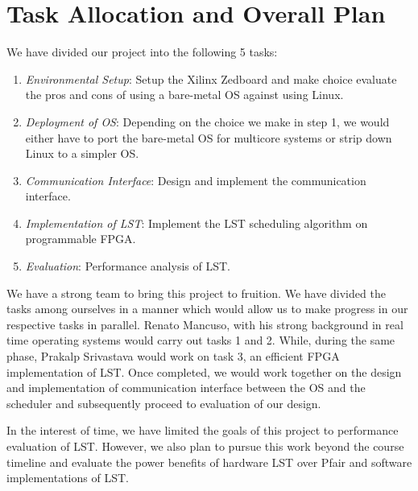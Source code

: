 \section{Task Allocation and Overall Plan}
We have divided our project into the following 5 tasks:
\begin{enumerate}
\item \textit{Environmental Setup}: Setup the Xilinx Zedboard and make choice
evaluate the pros and cons of using a bare-metal OS against using Linux.
\item \textit{Deployment of OS}: Depending on the choice we make in step 1, we
would either have to port the bare-metal OS for multicore systems or strip down
Linux to a simpler OS.
\item \textit{Communication Interface}: Design and implement the communication
interface. 
\item \textit{Implementation of LST}: Implement the LST scheduling algorithm on 
programmable FPGA. 
\item \textit{Evaluation}: Performance analysis of LST.
\end{enumerate}
We have a strong team to bring this project to fruition. We have divided
the tasks among ourselves in a manner which would allow us to make progress in
our respective tasks in parallel. Renato Mancuso, with his strong background in
real time operating systems would carry out tasks 1 and 2. While, during the
same phase,
Prakalp Srivastava would work on task 3, an efficient FPGA implementation of LST. Once
completed, we would work together on the design and implementation of
communication interface between the OS and the scheduler and subsequently
proceed to evaluation of our design.

In the interest of time, we have limited the goals of this project to performance
evaluation of LST. However, we also plan to pursue this work beyond the course
timeline and evaluate
the power benefits of hardware LST over Pfair and software implementations of
LST. 

